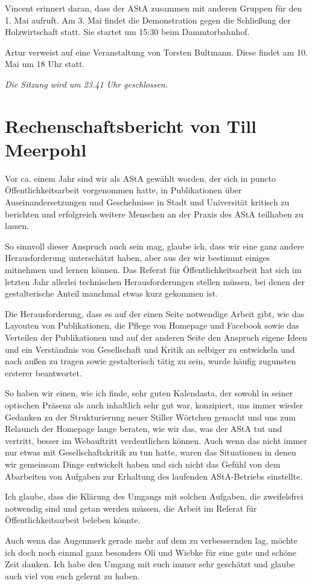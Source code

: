 \documentclass[ngerman,headheight=70pt]{scrartcl}
\begin{document}
    Vincent erinnert daran, dass der AStA zusammen mit anderen Gruppen
    für den 1. Mai aufruft. Am 3. Mai findet die Demonstration gegen
    die Schließung der Holzwirtschaft statt. Sie startet um 15:30 beim
    Dammtorbahnhof.

    Artur verweist auf eine Veranstaltung von Torsten Bultmann.
    Diese findet am 10. Mai um 18 Uhr statt.

    \textit{Die Sitzung wird um 23.41 Uhr geschlossen.}

    \newpage

    \section*{Rechenschaftsbericht von Till Meerpohl}

    Vor ca. einem Jahr sind wir als AStA gewählt worden, der sich in puncto
    Öffentlichkeitsarbeit vorgenommen hatte, in Publikationen über
    Auseinandersetzungen und Geschehnisse in Stadt und Universität kritisch zu
    berichten und erfolgreich weitere Menschen an der Praxis des AStA teilhaben
    zu lassen.

    So sinnvoll dieser Anspruch auch sein mag, glaube ich, dass wir eine ganz
    andere Herausforderung unterschätzt haben, aber aus der wir bestimmt einiges
    mitnehmen und lernen können. Das Referat für Öffentlichkeitsarbeit hat sich
    im letzten Jahr allerlei technischen Herausforderungen stellen müssen, bei
    denen der gestalterische Anteil manchmal etwas kurz gekommen ist.

    Die Herausforderung, dass es auf der einen Seite notwendige Arbeit gibt, wie
    das Layouten von Publikationen, die Pflege von Homepage und Facebook sowie das
    Verteilen der Publikationen und auf der anderen Seite den Anspruch eigene
    Ideen und ein Verständnis von Gesellschaft und Kritik an selbiger zu entwickeln
    und nach außen zu tragen sowie gestalterisch tätig zu sein, wurde häufig
    zugunsten ersterer beantwortet.

    So haben wir einen, wie ich finde, sehr guten Kalendasta, der sowohl in seiner
    optischen Präsenz als auch inhaltlich sehr gut war, konzipiert, uns immer
    wieder Gedanken zu der Strukturierung neuer Stiller Wörtchen gemacht und uns
    zum Relaunch der Homepage lange beraten, wie wir das, was der AStA tut und
    vertritt, besser im Webauftritt verdeutlichen können. Auch wenn das nicht
    immer nur etwas mit Gesellschaftskritik zu tun hatte, waren das Situationen
    in denen wir gemeinsam Dinge entwickelt haben und sich nicht das Gefühl von
    dem Abarbeiten von Aufgaben zur Erhaltung des laufenden AStA-Betriebs einstellte.

    Ich glaube, dass die Klärung des Umgangs mit solchen Aufgaben, die zweifelsfrei
    notwendig sind und getan werden müssen, die Arbeit im Referat für
    Öffentlichkeitsarbeit beleben könnte.

    Auch wenn das Augenmerk gerade mehr auf dem zu verbessernden lag, möchte ich
    doch noch einmal ganz besonders Oli und Wiebke für eine gute und schöne Zeit
    danken. Ich habe den Umgang mit euch immer sehr geschätzt und glaube auch
    viel von euch gelernt zu haben.
\end{document}
